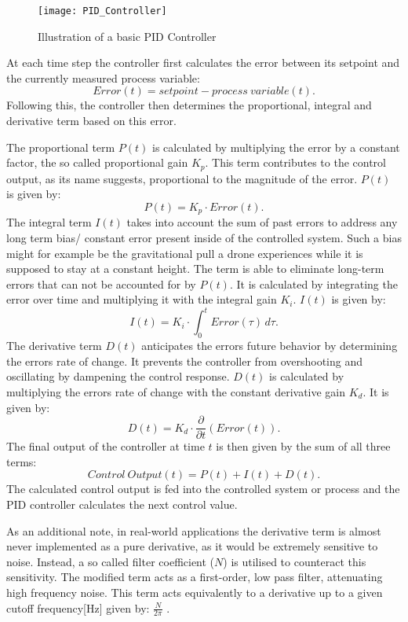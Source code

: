 \begin{figure}[h]
	\centerline{\texttt{[image: PID\_Controller]}}
	\caption{Illustration of a basic PID Controller}
	\label{figure: PID Controller}
\end{figure}


At each time step the controller first calculates the error between its setpoint and the currently measured process variable: 
\[
	Error(t) = setpoint - process\ variable(t)
.\]
Following this, the controller then determines the proportional, integral and derivative term based on this error.

The proportional term $P(t)$ is calculated by multiplying the error by a constant factor, the so called proportional gain $K_p$.
This term contributes to the control output, as its name suggests, proportional to the magnitude of the error.
$P(t)$ is given by:
\[
	P(t) = K_p \cdot Error(t)
.\]
The integral term $I(t)$ takes into account the sum of past errors to address any long term bias/ constant error present inside of the controlled system.
Such a bias might for example be the gravitational pull a drone experiences while it is supposed to stay at a constant height.
The term is able to eliminate long-term errors that can not be accounted for by $P(t)$.
It is calculated by integrating the error over time and multiplying it with the integral gain $K_i$.
$I(t)$ is given by:
\[
	I(t) = K_i \cdot \int_{0}^{t} Error(\tau) \,d\tau
.\]
The derivative term $D(t)$ anticipates the errors future behavior by determining the errors rate of change.
It prevents the controller from overshooting and oscillating by dampening the control response.
$D(t)$ is calculated by multiplying the errors rate of change with the constant derivative gain $K_d$.
It is given by:
\[
	D(t) = K_d \cdot \frac{\partial}{\partial t}(Error(t))
.\]
The final output of the controller at time $t$ is then given by the sum of all three terms:
\[
	Control\ Output(t) = P(t) + I(t) + D(t)
.\]
The calculated control output is fed into the controlled system or process and the PID controller calculates the next control value.

As an additional note, in real-world applications the derivative term is almost never implemented as a pure derivative, as it would be extremely sensitive to noise.
Instead, a so called filter coefficient ($N$) is utilised to counteract this sensitivity.
The modified term acts as a first-order, low pass filter, attenuating high frequency noise.
This term acts equivalently to a derivative up to a given cutoff frequency[Hz] given by: $\frac{N}{2\pi}$ .

